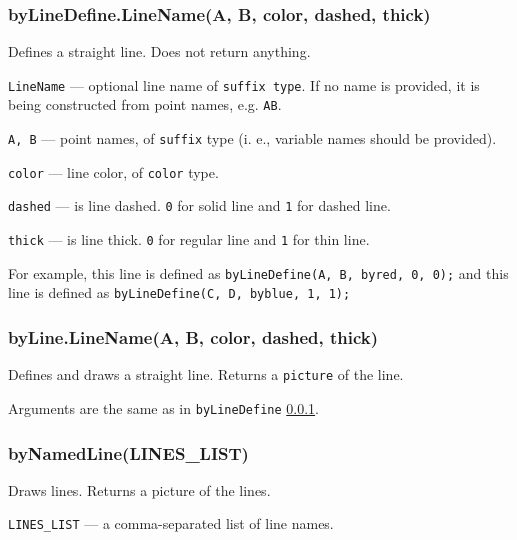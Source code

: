 \documentclass{ltxdoc}
\begin{document}

\subsubsection{byLineDefine.LineName(A, B, color, dashed, thick)}\label{byLineDefine}

	Defines a straight line. Does not return anything.
	
	\texttt{LineName} — optional line name of \texttt{suffix type}. If no name is provided, it is being constructed from point names, e.g. \texttt{AB}.
	
	\texttt{A, B} — point names, of \texttt{suffix} type (i. e., variable names should be provided).
	
	\texttt{color} — line color, of \texttt{color} type.
	
	\texttt{dashed} — is line dashed. \texttt{0} for solid line and \texttt{1} for dashed line.
	
	\texttt{thick} — is line thick. \texttt{0} for regular line and \texttt{1} for thin line.

	For example, this line  is defined as \texttt{byLineDefine(A, B, byred, 0, 0);} and this line  is defined as \texttt{byLineDefine(C, D, byblue, 1, 1);}


\subsubsection{byLine.LineName(A, B, color, dashed, thick)}\label{byLine}

	Defines and draws a straight line. Returns a \texttt{picture} of the line.
	
	Arguments are the same as in \texttt{byLineDefine} \ref{byLineDefine}.


\subsubsection{byNamedLine(LINES\_LIST)}\label{byNamedLine}

	Draws lines. Returns a picture of the lines.
	
	\texttt{LINES\_LIST} — a comma-separated list of line names.
\end{document}
